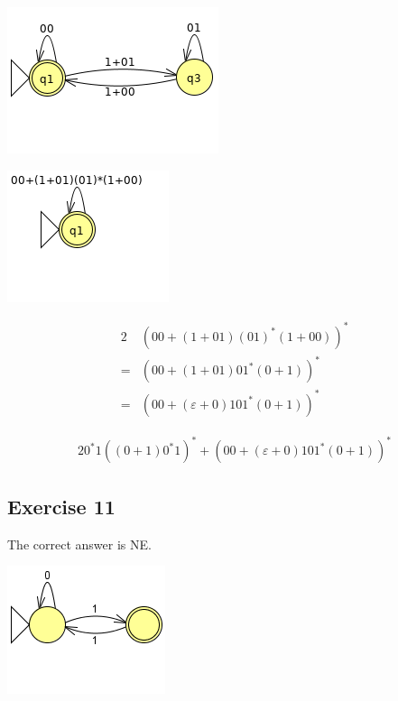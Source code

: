 {\begin{center}
\begin{minipage}{0.30\textwidth}
	\begin{center} \includegraphics[scale=0.5,trim={0 20mm 0 0}]{TP05_10_b_2_2} \end{center}
	\begin{center} \includegraphics[scale=0.5,trim={0 20mm 0 0}]{TP05_10_b_3_2} \end{center}
\end{minipage}%
\begin{minipage}{0.60\textwidth}
	\begin{alignat*}{2}
	 	 & (00+(1+01)(01)^*(1+00))^*\\
		=& (00+(1+01)01^*(0+1))^* \\
		=& (00+(\varepsilon+0)101^*(0+1))^*
	\end{alignat*}
\end{minipage}
\end{center}
\begin{alignat*}{2}
	0^*1((0+1)0^*1)^* + (00+(\varepsilon+0)101^*(0+1))^*
\end{alignat*}
\subsection{Exercise 11}
The correct answer is NE.
\begin{center} \includegraphics[scale=0.5]{TP05_11} \end{center}
}

